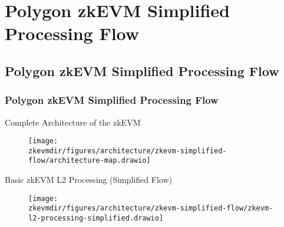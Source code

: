 

\renewcommand{\mytitle}{Polygon zkEVM Simplified Processing Flow}
\ifZEROSEC \fi
\ifSEC \section{\mytitle{}}\fi
\ifSUBSEC \subsection{\mytitle{}}\fi
\ifSUBSUBSEC \subsubsection{\mytitle{}}\fi


\begin{frame}{Complete Architecture of the zkEVM}
\begin{figure}
\texttt{[image: \\zkevmdir/figures/architecture/zkevm-simplified-flow/architecture-map.drawio]}
\end{figure}
\end{frame}




\begin{frame}[t]{Basic zkEVM L2 Processing (Simplified Flow)}
\begin{figure}
\texttt{[image: \\zkevmdir/figures/architecture/zkevm-simplified-flow/zkevm-l2-processing-simplified.drawio]}
\end{figure}
\end{frame}




